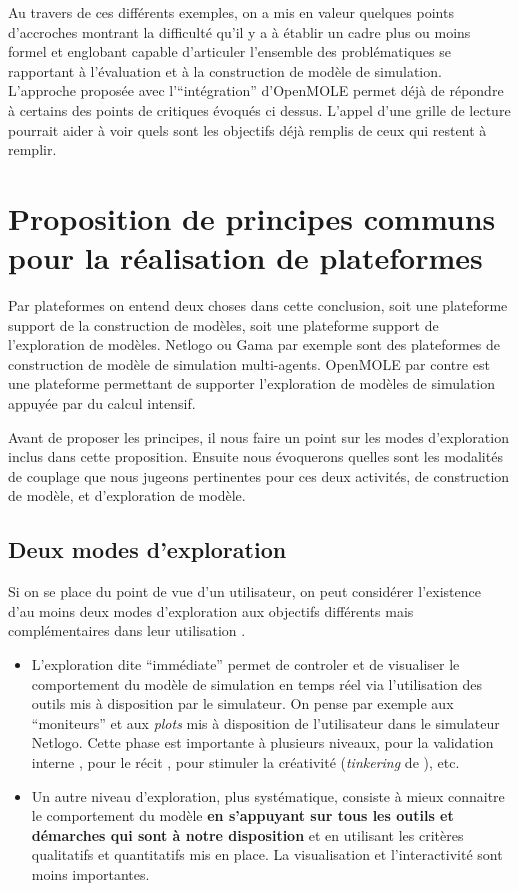 Au travers de ces différents exemples, on a mis en valeur quelques points d'accroches montrant la difficulté qu'il y a à établir un cadre plus ou moins formel et englobant capable d'articuler l'ensemble des problématiques se rapportant à l'évaluation et à la construction de modèle de simulation. L'approche proposée avec l'\enquote{intégration}  d'OpenMOLE permet déjà de répondre à certains des points de critiques évoqués ci dessus. L'appel d'une grille de lecture pourrait aider à voir quels sont les objectifs déjà remplis de ceux qui restent à remplir.

\section{Proposition de principes communs pour la réalisation de plateformes}

Par plateformes on entend deux choses dans cette conclusion, soit une plateforme support de la construction de modèles, soit une plateforme support de l'exploration de modèles. Netlogo ou Gama par exemple sont des plateformes de construction de modèle de simulation multi-agents. OpenMOLE par contre est une plateforme permettant de supporter l'exploration de modèles de simulation appuyée par du calcul intensif.

Avant de proposer les principes, il nous faire un point sur les modes d'exploration inclus dans cette proposition. Ensuite nous évoquerons quelles sont les modalités de couplage que nous jugeons pertinentes pour ces deux activités, de construction de modèle, et d'exploration de modèle.

\subsection{Deux modes d'exploration}

Si on se place du point de vue d'un utilisateur, on peut considérer l'existence d'au moins deux modes d'exploration aux objectifs différents mais complémentaires dans leur utilisation \autocite[36]{Amblard2003}.

\begin{itemize}
 \item L'exploration dite \enquote{immédiate} permet de controler et de visualiser le comportement du modèle de simulation en temps réel via l'utilisation des outils mis à disposition par le simulateur. On pense par exemple aux \enquote{moniteurs} et aux \textit{plots}  mis à disposition de l'utilisateur dans le simulateur Netlogo. Cette phase est importante à plusieurs niveaux, pour la validation interne \autocite{Amblard2006} , pour le récit \autocites{Millington2012,OSullivan2004}, pour stimuler la créativité (\textit{tinkering} de \textcite{Resnick2013}), etc.  
 \item Un autre niveau d'exploration, plus systématique, consiste à mieux connaitre le comportement du modèle \textbf{en s'appuyant sur tous les outils et démarches qui sont à notre disposition} et en utilisant les critères qualitatifs et quantitatifs mis en place. La visualisation et l'interactivité sont moins importantes. 
\end{itemize}

